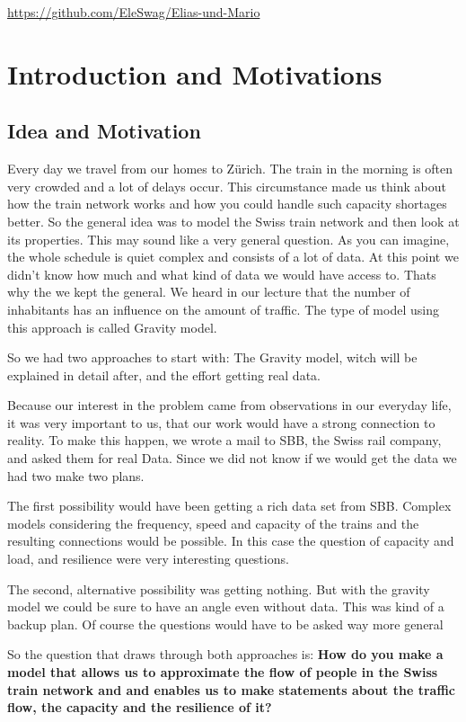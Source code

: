 \documentclass[11pt]{article}
\begin{document}
\url{https://github.com/EleSwag/Elias-und-Mario}

\section{Introduction and Motivations}

\subsection{Idea and Motivation}


Every day we travel from our homes to Z\"urich. The train in the morning is often very crowded and a lot of delays occur. This circumstance made us think about how the train network works and how you could handle such capacity shortages better. 
So the general idea was to model the Swiss train network and then look at its properties. This may sound like a very general question. As you can imagine, the whole schedule is quiet complex and consists of a lot of data. At this point we didn't know how much and what kind of data we would have access to. Thats why the we kept the general. We heard in our lecture that the number of inhabitants has an influence on the amount of traffic. The type of model using this approach is called Gravity model.

So we had two approaches to start with: The Gravity model, witch will be explained in detail after, and the effort getting real data.

Because our interest in the problem came from observations in our everyday life, it was very important to us, that our work would have a strong connection to reality. To make this happen, we wrote a mail to SBB, the Swiss rail company, and asked them for real Data. Since we did not know if we would get the data we had two make two plans.

The first possibility would have been getting a rich data set from SBB. Complex models considering the frequency, speed and capacity of the trains and the resulting connections would be possible. In this case the question of capacity and load, and resilience were very interesting questions.

The second, alternative possibility was getting nothing. But with the gravity model we could be sure to have an angle even  without data. This was kind of a backup plan. Of course the questions would have to be asked way more general  

So the question that draws through both approaches is:\newline 
\textbf{How do you make a model that allows us to approximate the flow of people in the Swiss train network and and enables us to make statements about the traffic flow, the capacity and the resilience of it?}    
\end{document}
